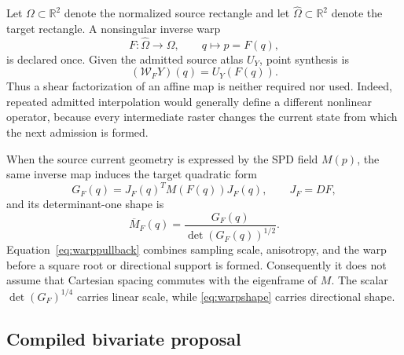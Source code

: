 \documentclass[journal]{IEEEtran}
\newcommand{\R}{\mathbb{R}}
\begin{document}
Let \(\Omega\subset\R^2\) denote the normalized source rectangle and let
\(\widehat\Omega\subset\R^2\) denote the target rectangle.  A nonsingular
inverse warp
\begin{equation}
 F:\widehat\Omega\longrightarrow\Omega,\qquad q\longmapsto p=F(q),
 \label{eq:warpmap}
\end{equation}
is declared once.  Given the admitted source atlas \(U_Y\), point synthesis is
\begin{equation}
 (\mathcal W_FY)(q)=U_Y(F(q)).
 \label{eq:warppoint}
\end{equation}
Thus a shear factorization of an affine map is neither required nor used.
Indeed, repeated admitted interpolation would generally define a different
nonlinear operator, because every intermediate raster changes the current
state from which the next admission is formed.

When the source current geometry is expressed by the SPD field \(M(p)\), the
same inverse map induces the target quadratic form
\begin{equation}
 G_F(q)=J_F(q)^TM(F(q))J_F(q),
 \qquad J_F=DF,
 \label{eq:warppullback}
\end{equation}
and its determinant-one shape is
\begin{equation}
 \overline M_F(q)=\frac{G_F(q)}{\det(G_F(q))^{1/2}}.
 \label{eq:warpshape}
\end{equation}
Equation~\eqref{eq:warppullback} combines sampling scale, anisotropy, and the
warp before a square root or directional support is formed.  Consequently it
does not assume that Cartesian spacing commutes with the eigenframe of
\(M\).  The scalar \(\det(G_F)^{1/4}\) carries linear scale, while
\eqref{eq:warpshape} carries directional shape.

\subsection{Compiled bivariate proposal}
\end{document}
